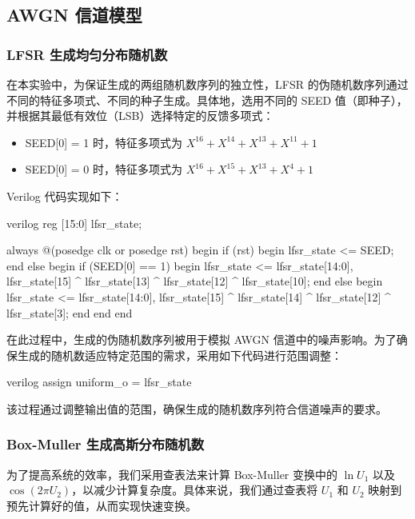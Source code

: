 \subsection{AWGN 信道模型}

\subsubsection{LFSR 生成均匀分布随机数}

在本实验中，为保证生成的两组随机数序列的独立性，LFSR 的伪随机数序列通过不同的特征多项式、不同的种子生成。具体地，选用不同的 SEED 值（即种子），并根据其最低有效位（LSB）选择特定的反馈多项式：

\begin{itemize} 
    \item SEED[0] = 1 时，特征多项式为 $X^{16} + X^{14} + X^{13} + X^{11} + 1$ 
    \item SEED[0] = 0 时，特征多项式为 $X^{16} + X^{15} + X^{13} + X^{4} + 1$ 
\end{itemize}

Verilog 代码实现如下：

\begin{codeblock}{verilog}
reg [15:0] lfsr_state;

always @(posedge clk or posedge rst) begin
    if (rst) begin
        lfsr_state <= SEED;
    end else begin
        if (SEED[0] == 1) begin
            lfsr_state <= {lfsr_state[14:0], lfsr_state[15] ^ lfsr_state[13] ^ lfsr_state[12] ^ lfsr_state[10]};
        end else begin
            lfsr_state <= {lfsr_state[14:0], lfsr_state[15] ^ lfsr_state[14] ^ lfsr_state[12] ^ lfsr_state[3]};
        end
    end
end
\end{codeblock}

在此过程中，生成的伪随机数序列被用于模拟 AWGN 信道中的噪声影响。为了确保生成的随机数适应特定范围的需求，采用如下代码进行范围调整：

\begin{codeblock}{verilog}
assign uniform_o = lfsr_state %
\end{codeblock}

该过程通过调整输出值的范围，确保生成的随机数序列符合信道噪声的要求。


\subsubsection{Box-Muller 生成高斯分布随机数}

为了提高系统的效率，我们采用查表法来计算 Box-Muller 变换中的 $\ln U_1$ 以及 $\cos(2 \pi U_2)$，以减少计算复杂度。具体来说，我们通过查表将 $U_1$ 和 $U_2$ 映射到预先计算好的值，从而实现快速变换。

